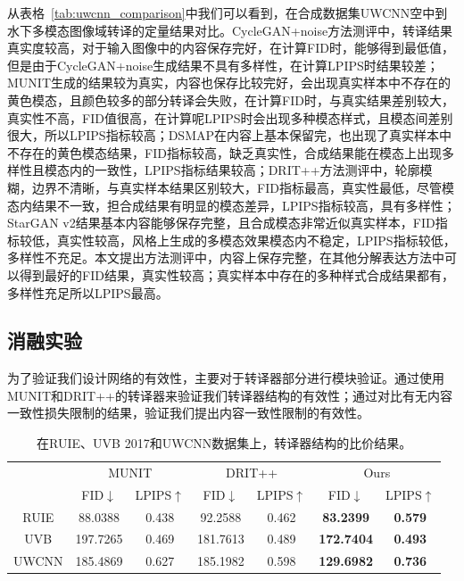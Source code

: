 从表格~\ref{tab:uwcnn_comparison}中我们可以看到，在合成数据集UWCNN空中到水下多模态图像域转译的定量结果对比。CycleGAN+noise方法测评中，转译结果真实度较高，对于输入图像中的内容保存完好，在计算FID时，能够得到最低值，但是由于CycleGAN+noise生成结果不具有多样性，在计算LPIPS时结果较差；MUNIT生成的结果较为真实，内容也保存比较完好，会出现真实样本中不存在的黄色模态，且颜色较多的部分转译会失败，在计算FID时，与真实结果差别较大，真实性不高，FID值很高，在计算呢LPIPS时会出现多种模态样式，且模态间差别很大，所以LPIPS指标较高；DSMAP在内容上基本保留完，也出现了真实样本中不存在的黄色模态结果，FID指标较高，缺乏真实性，合成结果能在模态上出现多样性且模态内的一致性，LPIPS指标结果较高；DRIT++方法测评中，轮廓模糊，边界不清晰，与真实样本结果区别较大，FID指标最高，真实性最低，尽管模态内结果不一致，担合成结果有明显的模态差异，LPIPS指标较高，具有多样性；StarGAN v2结果基本内容能够保存完整，且合成模态非常近似真实样本，FID指标较低，真实性较高，风格上生成的多模态效果模态内不稳定，LPIPS指标较低，多样性不充足。本文提出方法测评中，内容上保存完整，在其他分解表达方法中可以得到最好的FID结果，真实性较高；真实样本中存在的多种样式合成结果都有，多样性充足所以LPIPS最高。

\subsection{消融实验}

为了验证我们设计网络的有效性，主要对于转译器部分进行模块验证。通过使用MUNIT和DRIT++的转译器来验证我们转译器结构的有效性；通过对比有无内容一致性损失限制的结果，验证我们提出内容一致性限制的有效性。

\begin{table}[htbp]
  \centering
  \caption{在RUIE、UVB 2017和UWCNN数据集上，转译器结构的比价结果。}
    \begin{tabular}{c|c|c|c|c|c|c}
    \hline
    \multirow{2}[3]{*}{} & \multicolumn{2}{c|}{MUNIT} & \multicolumn{2}{c|}{DRIT++} & \multicolumn{2}{c}{Ours} \\
\cmidrule{2-7}          & \multicolumn{1}{c|}{FID$\downarrow$ } & \multicolumn{1}{c|}{LPIPS$\uparrow$} & \multicolumn{1}{c|}{FID$\downarrow$ } & \multicolumn{1}{c|}{LPIPS$\uparrow$} & \multicolumn{1}{c|}{FID$\downarrow$ } & LPIPS$\uparrow$ \\
    \midrule
    RUIE  & 88.0388 & 0.438 & 92.2588 & 0.462 & \textbf{83.2399} & \textbf{0.579} \\
    UVB  & 197.7265 & 0.469 & 181.7613 & 0.489 & \textbf{172.7404} & \textbf{0.493} \\
    UWCNN & 185.4869 & 0.627 & 185.1982 & 0.598 & \textbf{129.6982} & \textbf{0.736} \\
    \hline
    \end{tabular}%
  \label{tab:comp_G}%
\end{table}%

